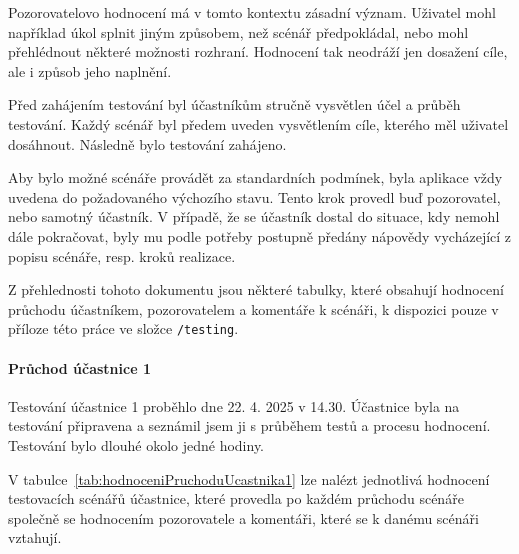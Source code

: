 Pozorovatelovo hodnocení má v tomto kontextu zásadní význam. 
Uživatel mohl například úkol splnit jiným způsobem, než scénář předpokládal, nebo mohl přehlédnout některé možnosti rozhraní. 
Hodnocení tak neodráží jen dosažení cíle, ale i způsob jeho naplnění.

Před zahájením testování byl účastníkům stručně vysvětlen účel a průběh testování. 
Každý scénář byl předem uveden vysvětlením cíle, kterého měl uživatel dosáhnout. 
Následně bylo testování zahájeno.

Aby bylo možné scénáře provádět za standardních podmínek, byla aplikace vždy uvedena do požadovaného výchozího stavu. 
Tento krok provedl buď pozorovatel, nebo samotný účastník. 
V případě, že se účastník dostal do situace, kdy nemohl dále pokračovat, byly mu podle potřeby postupně předány nápovědy vycházející z popisu scénáře, resp. kroků realizace.

Z přehlednosti tohoto dokumentu jsou některé tabulky, které obsahují hodnocení průchodu účastníkem, pozorovatelem a komentáře k scénáři, k dispozici pouze v příloze této práce ve složce \verb|/testing|.

\paragraph{Průchod účastnice 1}

Testování účastnice 1 proběhlo dne 22. 4. 2025 v 14.30. 
Účastnice byla na testování připravena a seznámil jsem ji s průběhem testů a procesu hodnocení. 
Testování bylo dlouhé okolo jedné hodiny.

V tabulce~\ref{tab:hodnoceniPruchoduUcastnika1} lze nalézt jednotlivá hodnocení testovacích scénářů účastnice, které provedla po každém průchodu scénáře společně se hodnocením pozorovatele a komentáři, které se k danému scénáři vztahují.

